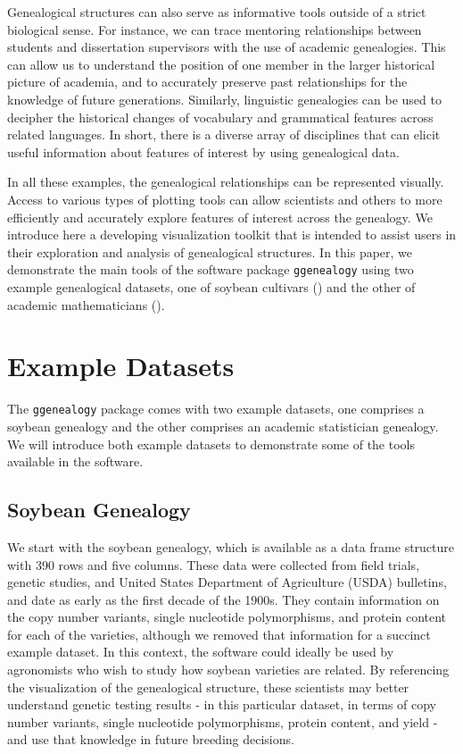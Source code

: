 \documentclass[11pt,a4paper,oldfontcommands,openany]{memoir}
\numberwithin{equation}{section} %
\newcommand{\pkg}[1]{{\texttt{#1}}}
\begin{document}
Genealogical structures can also serve as informative tools outside of a strict biological sense. For instance, we can trace mentoring relationships between students and dissertation supervisors with the use of academic genealogies. This can allow us to understand the position of one member in the larger historical picture of academia, and to accurately preserve past relationships for the knowledge of future generations. Similarly, linguistic genealogies can be used to decipher the historical changes of vocabulary and grammatical features across related languages. In short, there is a diverse array of disciplines that can elicit useful information about features of interest by using genealogical data.

In all these examples, the genealogical relationships can be represented visually. Access to various types of plotting tools can allow scientists and others to more efficiently and accurately explore features of interest across the genealogy. We introduce here a developing visualization toolkit that is intended to assist users in their exploration and analysis of genealogical structures. In this paper, we demonstrate the main tools of the software package \pkg{ggenealogy} using two example genealogical datasets, one of soybean cultivars (\citealt{soybean}) and the other of academic mathematicians (\citealt{mgp}).

\section{Example Datasets}
\label{exData}

The \pkg{ggenealogy} package comes with two example datasets, one comprises a soybean genealogy and the other comprises an academic statistician genealogy. We will introduce both example datasets to demonstrate some of the tools available in the software.

\subsection{Soybean Genealogy}

We start with the soybean genealogy, which is available as a data frame structure with 390 rows and five columns. These data were collected from field trials, genetic studies, and United States Department of Agriculture (USDA) bulletins, and date as early as the first decade of the 1900s. They contain information on the copy number variants, single nucleotide polymorphisms, and protein content for each of the varieties, although we removed that information for a succinct example dataset. In this context, the software could ideally be used by agronomists who wish to study how soybean varieties are related. By referencing the visualization of the genealogical structure, these scientists may better understand genetic testing results - in this particular dataset, in terms of copy number variants, single nucleotide polymorphisms, protein content, and yield - and use that knowledge in future breeding decisions.
\end{document}
